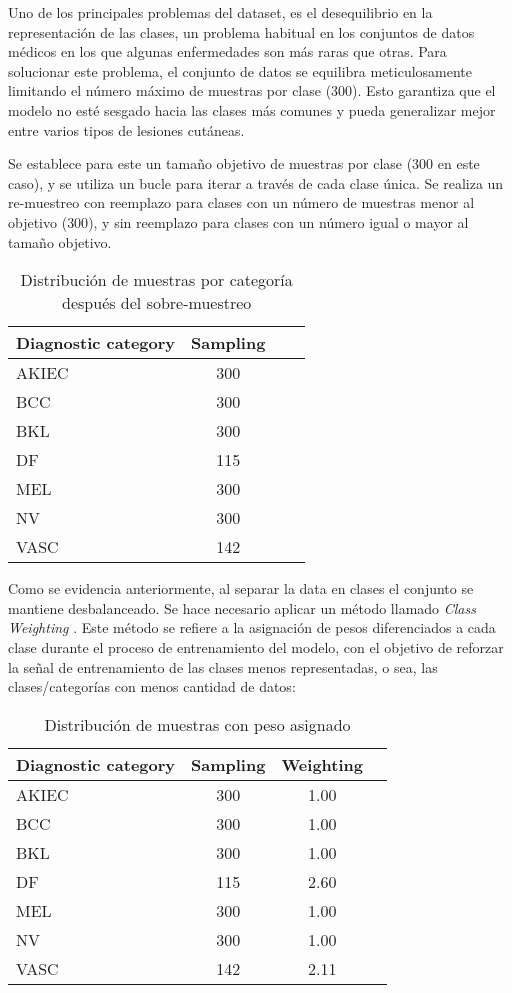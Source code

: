 Uno de los principales problemas del dataset, es el desequilibrio en la representación de las clases, un problema habitual en los conjuntos de datos médicos en los que algunas enfermedades son más raras que otras. Para solucionar este problema, el conjunto de datos se equilibra meticulosamente limitando el número máximo de muestras por clase ($300$). Esto garantiza que el modelo no esté sesgado hacia las clases más comunes y pueda generalizar mejor entre varios tipos de lesiones cutáneas.

Se establece para este un tamaño objetivo de muestras por clase ($300$ en este caso), y se utiliza un bucle para iterar a través de cada clase única. Se realiza un re-muestreo con reemplazo para clases con un número de muestras menor al objetivo ($300$), y sin reemplazo para clases con un número igual o mayor al tamaño objetivo.

\begin{table}[ht]
   \centering
   \begin{tabular}{lccc}
   \hline
   Diagnostic category & Sampling  \\ \hline
   AKIEC & 300 \\
   BCC & 300 \\
   BKL & 300 \\
   DF & 115 \\
   MEL & 300 \\
   NV & 300 \\
   VASC & 142 \\ \hline
   \end{tabular}
   \caption{Distribución de muestras por categoría después del sobre-muestreo}
   \label{tab:sampling_distribution_1}
   \end{table}


Como se evidencia anteriormente, al separar la data en clases el conjunto se mantiene desbalanceado. Se hace necesario aplicar un método llamado \textit{Class Weighting} . Este método se refiere a la asignación de pesos diferenciados a cada clase durante el proceso de entrenamiento del modelo, con el objetivo de reforzar la señal de entrenamiento de las clases menos representadas, o sea, las clases/categorías con menos cantidad de datos:

\begin{table}[ht]
   \centering
   \begin{tabular}{lccc}
   \hline
   Diagnostic category & Sampling  & Weighting\\ \hline
   AKIEC & 300 & 1.00\\
   BCC & 300 & 1.00\\
   BKL & 300 & 1.00\\
   DF & 115 & 2.60\\
   MEL & 300 & 1.00\\
   NV & 300 & 1.00\\
   VASC & 142 & 2.11\\ \hline
   \end{tabular}
   \caption{Distribución de muestras con peso asignado}
   \label{tab:weighting_distribution}
   \end{table}


